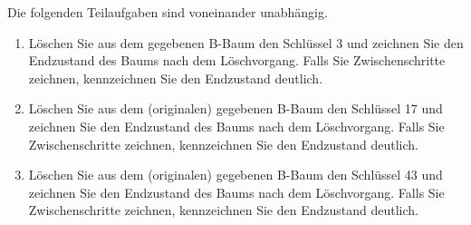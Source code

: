 \documentclass{bschlangaul-aufgabe}
\begin{document}
\begin{enumerate}
Die folgenden Teilaufgaben sind voneinander unabhängig.
\begin{enumerate}

%

\item Löschen Sie aus dem gegebenen B-Baum den Schlüssel 3 und zeichnen
Sie den Endzustand des Baums nach dem Löschvorgang. Falls Sie
Zwischenschritte zeichnen, kennzeichnen Sie den Endzustand deutlich.

%

\item Löschen Sie aus dem (originalen) gegebenen B-Baum den Schlüssel 17
und zeichnen Sie den Endzustand des Baums nach dem Löschvorgang. Falls
Sie Zwischenschritte zeichnen, kennzeichnen Sie den Endzustand deutlich.

%

\item Löschen Sie aus dem (originalen) gegebenen B-Baum den Schlüssel 43
und zeichnen Sie den Endzustand des Baums nach dem Löschvorgang. Falls
Sie Zwischenschritte zeichnen, kennzeichnen Sie den Endzustand deutlich.
\end{enumerate}
\end{enumerate}
\end{document}
